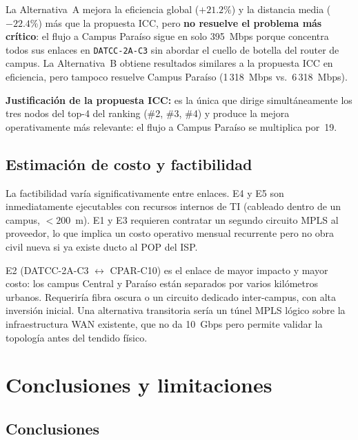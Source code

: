 \documentclass[11pt, a4paper]{article}
\newenvironment{hallazgo}{%
    \begin{mdframed}[backgroundcolor=verdeFondo, linecolor=verde,
        linewidth=2pt, leftline=true, rightline=false,
        topline=false, bottomline=false,
        innerleftmargin=10pt, innerrightmargin=10pt,
        innertopmargin=6pt, innerbottommargin=6pt,
        skipabove=6pt, skipbelow=6pt]
    \small
}{\end{mdframed}}
\begin{document}
La Alternativa~A mejora la eficiencia global ($+21.2\%$) y la distancia media
($-22.4\%$) más que la propuesta ICC, pero \textbf{no resuelve el problema más
crítico}: el flujo a Campus Paraíso sigue en solo 395~Mbps porque concentra
todos sus enlaces en \texttt{DATCC-2A-C3} sin abordar el cuello de botella
del router de campus. La Alternativa~B obtiene resultados similares a la
propuesta ICC en eficiencia, pero tampoco resuelve Campus Paraíso
(1\,318~Mbps vs.\ 6\,318~Mbps).

\begin{hallazgo}
\textbf{Justificación de la propuesta ICC:} es la única que dirige
simultáneamente los tres nodos del top-4 del ranking (\#2, \#3, \#4) y
produce la mejora operativamente más relevante: el flujo a Campus Paraíso
se multiplica por~19.
\end{hallazgo}

\subsection{Estimación de costo y factibilidad}

La factibilidad varía significativamente entre enlaces. E4 y E5 son
inmediatamente ejecutables con recursos internos de TI (cableado dentro de
un campus, $< 200$~m). E1 y E3 requieren contratar un segundo circuito MPLS
al proveedor, lo que implica un costo operativo mensual recurrente pero no
obra civil nueva si ya existe ducto al POP del ISP.

E2 (DATCC-2A-C3 $\leftrightarrow$ CPAR-C10) es el enlace de mayor impacto
y mayor costo: los campus Central y Paraíso están separados por varios
kilómetros urbanos. Requeriría fibra oscura o un circuito dedicado
inter-campus, con alta inversión inicial. Una alternativa transitoria sería
un túnel MPLS lógico sobre la infraestructura WAN existente, que no da
10~Gbps pero permite validar la topología antes del tendido físico.

\section{Conclusiones y limitaciones}

\subsection{Conclusiones}
\end{document}
